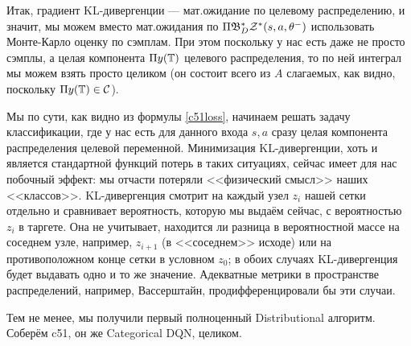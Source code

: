 Итак, градиент KL-дивергенции --- мат.ожидание по целевому распределению, и значит, мы можем вместо мат.ожидания по $\Pi \mathfrak{B}^*_D \mathcal{Z}^*(s, a, \theta^-)$ использовать Монте-Карло оценку по сэмплам. При этом поскольку у нас есть даже не просто сэмплы, а целая компонента $\Pi y(\mathbb{T})$ целевого распределения, то по ней интеграл мы можем взять просто целиком (он состоит всего из $A$ слагаемых, как видно, поскольку $\Pi y(\mathbb{T}) \in \mathcal{C}$).

Мы по сути, как видно из формулы \eqref{c51loss}, начинаем решать задачу классификации, где у нас есть для данного входа $s, a$ сразу целая компонента распределения целевой переменной. Минимизация KL-дивергенции, хоть и является стандартной функций потерь в таких ситуациях, сейчас имеет для нас побочный эффект: мы отчасти потеряли <<физический смысл>> наших <<классов>>. KL-дивергенция смотрит на каждый узел $z_i$ нашей сетки отдельно и сравнивает вероятность, которую мы выдаём сейчас, с вероятностью $z_i$ в таргете. Она не учитывает, находится ли разница в вероятностной массе на соседнем узле, например, $z_{i+1}$ (в <<соседнем>> исходе) или на противоположном конце сетки в условном $z_0$; в обоих случаях KL-дивергенция будет выдавать одно и то же значение. Адекватные метрики в пространстве распределений, например, Вассерштайн, продифференцировали бы эти случаи.

Тем не менее, мы получили первый полноценный Distributional алгоритм. Соберём c51, он же Categorical DQN, целиком.

